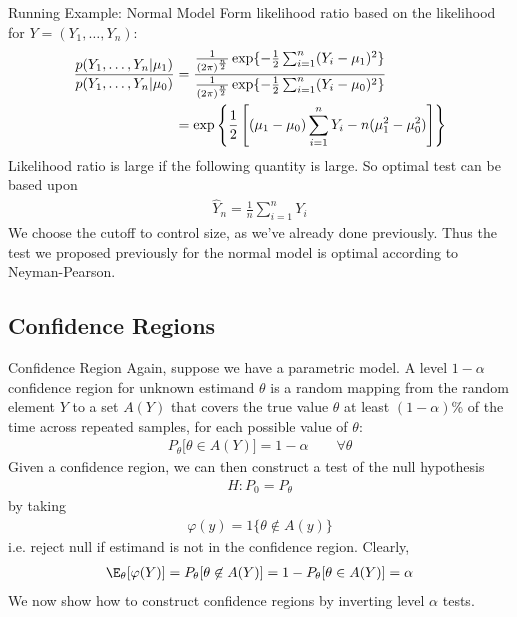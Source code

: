 \documentclass[aspectratio=169, handout]{beamer}
\newcommand{\sumin}{\sum^n_{i=1}}
\begin{document}
{\footnotesize
\begin{frame}{Running Example: Normal Model}
Form likelihood ratio based on the likelihood for
$Y=(Y_1,\ldots,Y_n)$:
\begin{align*}
  \frac{%
    p(Y_1,\ldots,Y_n|\mu_1)
  }{%
    p(Y_1,\ldots,Y_n|\mu_0)
  }
  &=
  \frac{%
    \frac{1}{(2\pi)^{\frac{n}{2}}}
    \exp\{
      -\frac{1}{2}
      \sumin (Y_i-\mu_1)^2
    \}
  }{%
    \frac{1}{(2\pi)^{\frac{n}{2}}}
    \exp\{
      -\frac{1}{2}
      \sumin (Y_i-\mu_0)^2
    \}
  }
  \\
  &=
  \exp\left\{
    \frac{1}{2}
    \left[
    (\mu_1-\mu_0)\sumin Y_i
    -
    n(\mu_1^2 - \mu_0^2)
    \right]
  \right\}
\end{align*}
Likelihood ratio is large if the following quantity is large.
So optimal test can be based upon
\begin{align*}
  \hat{Y}_n
  =
  \frac{1}{n}
  \sumin
  Y_i
\end{align*}
We choose the cutoff to control size, as we've already done previously.
Thus the test we proposed previously for the normal model is
\alert{optimal} according to Neyman-Pearson.
\end{frame}
}



\subsection{Confidence Regions}


{\footnotesize
\begin{frame}{Confidence Region}
Again, suppose we have a parametric model.
A level $1-\alpha$ \alert{confidence region} for unknown estimand
$\theta$ is a random mapping  from the random element $Y$ to a set
$A(Y)$ that covers the true value $\theta$ at least
$(1-\alpha)$\% of the time across repeated samples, for each possible
value of $\theta$:
\begin{align*}
  P_{\theta}\big[\theta \in A(Y)\big]
  =
  1-\alpha
  \qquad
  \forall \theta
\end{align*}
\pause
Given a confidence region, we can then construct a test of the
null hypothesis
\begin{align*}
  H: P_0 = P_\theta
\end{align*}
by taking
\begin{align*}
  \varphi(y)
  = {1}\big\{\theta\not\in A(y)\big\}
\end{align*}
i.e. reject null if estimand is not in the confidence region.
\pause
Clearly,
\begin{align*}
  \E_{\theta}[\varphi(Y)]
  =
  P_{\theta}[\theta\not\in A(Y)]
  =
  1-
  P_{\theta}[\theta\in A(Y)]
  =
  \alpha
\end{align*}
We now show how to \alert{construct} confidence regions by inverting
level $\alpha$ tests.
\end{frame}
}
\end{document}
